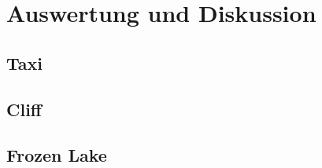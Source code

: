 \section{Auswertung und Diskussion}

\subsection{Taxi}

\subsection{Cliff}

\subsection{Frozen Lake}